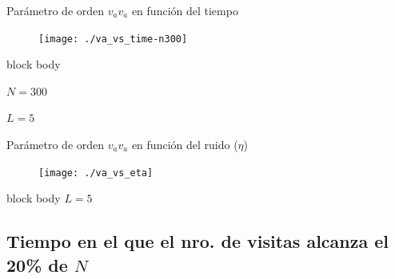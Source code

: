\documentclass{beamer}
\begin{document}
            \begin{frame}{Parámetro de orden $v_a$}{$v_a$ en función del tiempo}
                    \begin{figure}[H!]
                        \texttt{[image: ./va\_vs\_time-n300]}
                        \label{fig:va_4}
                    \end{figure}
                    \begin{beamercolorbox}[sep=5pt,center]{block body}
                        \begin{minipage}[t]{0.45\textwidth}
                            \centering
                            \small{$N=300$}
                        \end{minipage}
                        \hfill
                        \begin{minipage}[t]{0.45\textwidth}
                            \centering
                            \small{$L=5$}
                        \end{minipage}
                    \end{beamercolorbox}
            \end{frame}

            \begin{frame}{Parámetro de orden $v_a$}{$v_a$ en función del ruido ($\eta$)}
                \begin{figure}[H!]
                    \texttt{[image: ./va\_vs\_eta]}
                    \label{fig:va_5}
                \end{figure}
                \begin{beamercolorbox}[sep=5pt,center]{block body}
                    \small{$L=5$}
                \end{beamercolorbox}
            \end{frame}

        \subsection{Tiempo en el que el nro. de visitas alcanza el 20\% de $N$}
\end{document}

